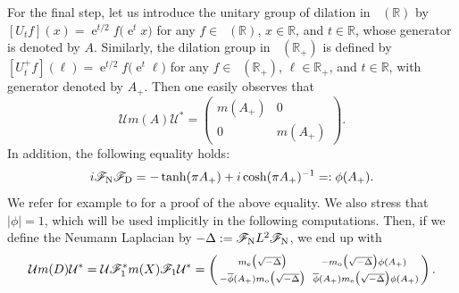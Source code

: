 \documentclass[11pt]{article}
\def\F{\mathscr F}
\def\R{\mathbb R}
\def\U{\mathcal U}
\def\e{\mathop{\mathrm{e}}\nolimits}
\def\ltwo{\mathop{\mathrm{L}^2}\nolimits}
\begin{document}
For the final step, let us introduce the unitary group of dilation in $\ltwo(\R)$
by $[U_tf](x)=\e^{t/2}f\big(\e^t x\big)$ for any $f\in \ltwo(\R)$, $x\in \R$, and $t\in \R$, whose generator is denoted by $A$. Similarly, the dilation group in $\ltwo(\R_+)$ is defined by
$[U_t^+ f](\ell)=\e^{t/2}f\big(\e^t \ell\big)$ for any $f\in \ltwo(\R_+)$, $\ell\in \R_+$, and $t\in \R$, with generator denoted by $A_+$.
Then one easily observes that
\begin{equation*}
\U m(A)\U^*=
\left(\begin{smallmatrix}
m(A_+) & 0\\
0 & m(A_+)
\end{smallmatrix}\right).
\end{equation*}
In addition, the following equality holds:  
$$
i\F_{\rm N} \F_{\rm D} = -\tanh(\pi A_+)+ i \cosh(\pi A_+)^{-1}=:\phi(A_+).
$$
We refer for example to \cite[Prop.~4.13]{DR} for a proof of the above equality.
We also stress that $|\phi|=1$, which will be used implicitly in the following computations.
Then, if we define the Neumann Laplacian by $-\Delta:=\F_{\rm N} L^2 \F_{\rm N}$,
we end up with 
\begin{equation}\label{eq:g3}
\U m(D)\U^* = \U \F_1^* m(X) \F_1 \U^*
= 
\left(\begin{smallmatrix}
m_{\rm e}\big(\sqrt{-\Delta}\big) &  - m_{\rm o}\big(\sqrt{-\Delta}\big)
\phi(A_+)\\
-\overline{\phi}(A_+) m_{\rm o}\big(\sqrt{-\Delta}\big) 
&\  \overline{\phi}(A_+) m_{\rm e}\big(\sqrt{-\Delta}\big) \phi(A_+)
\end{smallmatrix}\right).
\end{equation}
\end{document}
